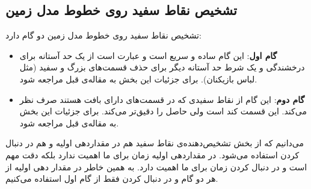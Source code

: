 \documentclass{report}
\begin{document}
\subsection{تشخیص نقاط سفید روی خطوط مدل زمین}
تشخیص نقاط سفید روی خطوط مدل زمین دو گام دارد:
\begin{itemize}
\item \textbf{گام اول}: 
این گام ساده و سریع است و عبارت است از یک حد آستانه برای درخشندگی و یک شرط حد آستانه دیگر برای حذف قسمت‌های بزرگ و سفید (مثل لباس بازیکنان). برای جزئیات این بخش به مقاله‌ی قبل مراجعه\cite{old_paper} شود.
\item \textbf{گام دوم}: 
این گام از نقاط سفیدی که در قسمت‌های دارای بافت هستند صرف نظر می‌کند. این قسمت کند است ولی حاصل را دقیق‌تر می‌کند. برای جزئیات این بخش به مقاله‌ی قبل مراجعه\cite{old_paper} شود.
\end{itemize}
می‌دانیم که از بخش تشخیص‌دهنده‌ی نقاط سفید هم در مقداردهی اولیه و هم در دنبال کردن استفاده می‌شود. در مقداردهی اولیه زمان برای ما اهمیت ندارد بلکه دقت مهم است و در دنبال کردن زمان برای ما اهمیت دارد. به همین خاطر در مقدار دهی اولیه از هر دو گام و در دنبال کردن فقط از گام اول استفاده می‌کنیم.
\subsection{}

\begin{latin}
{}

\end{latin}
\end{document}
